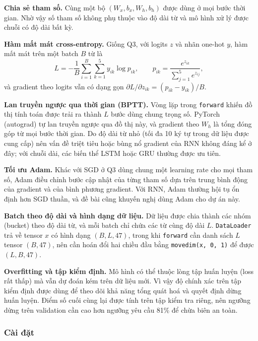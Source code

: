 \textbf{Chia sẻ tham số.} Cùng một bộ $(W_x, b_x, W_h, b_h)$ được dùng ở mọi bước
thời gian. Nhờ vậy số tham số không phụ thuộc vào độ dài từ và mô hình xử lý
được chuỗi có độ dài bất kỳ.

\textbf{Hàm mất mát cross-entropy.} Giống Q3, với logits $z$ và nhãn one-hot $y$,
hàm mất mát trên một batch $B$ từ là
\begin{equation}
L = -\frac{1}{B}\sum_{i=1}^{B}\sum_{k=1}^{5} y_{ik}\log p_{ik}, \qquad
p_{ik} = \frac{e^{z_{ik}}}{\sum_{j=1}^{5} e^{z_{ij}}},
\end{equation}
và gradient theo logits vẫn có dạng gọn $\partial L / \partial z_{ik} = (p_{ik} - y_{ik})/B$.

\textbf{Lan truyền ngược qua thời gian (BPTT).} Vòng lặp trong \texttt{forward}
khiến đồ thị tính toán được trải ra thành $L$ bước dùng chung trọng số. PyTorch
(autograd) tự lan truyền ngược qua đồ thị này, và gradient theo $W_h$ là tổng
đóng góp từ mọi bước thời gian. Do độ dài từ nhỏ (tối đa 10 ký tự trong dữ liệu
được cung cấp) nên vấn đề triệt tiêu hoặc bùng nổ gradient của RNN không đáng kể
ở đây; với chuỗi dài, các biến thể LSTM hoặc GRU thường được ưu tiên.

\textbf{Tối ưu Adam.} Khác với SGD ở Q3 dùng chung một learning rate cho mọi
tham số, Adam điều chỉnh bước cập nhật của từng tham số dựa trên trung bình
động của gradient và của bình phương gradient. Với RNN, Adam thường hội tụ ổn
định hơn SGD thuần, và đề bài cũng khuyến nghị dùng Adam cho dự án này.

\textbf{Batch theo độ dài và hình dạng dữ liệu.} Dữ liệu được chia thành các
nhóm (bucket) theo độ dài từ, và mỗi batch chỉ chứa các từ cùng độ dài $L$.
\texttt{DataLoader} trả về tensor $x$ có hình dạng $(B, L, 47)$, trong khi
\texttt{forward} cần danh sách $L$ tensor $(B, 47)$, nên cần hoán đổi hai chiều
đầu bằng \texttt{movedim(x, 0, 1)} để được $(L, B, 47)$.

\textbf{Overfitting và tập kiểm định.} Mô hình có thể thuộc lòng tập huấn luyện
(loss rất thấp) mà vẫn dự đoán kém trên dữ liệu mới. Vì vậy độ chính xác trên
tập kiểm định được dùng để theo dõi khả năng tổng quát hoá và quyết định dừng
huấn luyện. Điểm số cuối cùng lại được tính trên tập kiểm tra riêng, nên ngưỡng
dừng trên validation cần cao hơn ngưỡng yêu cầu 81\% để chừa biên an toàn.

\subsubsection{Cài đặt}

